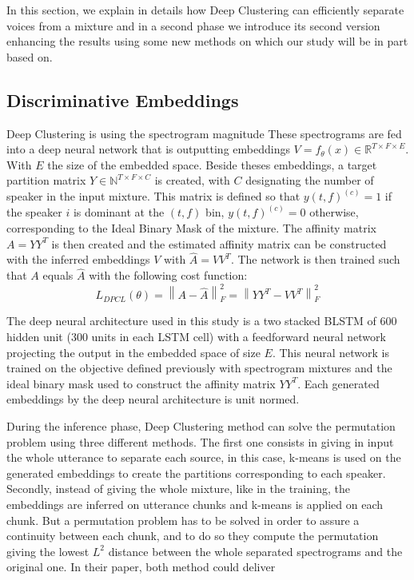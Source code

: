 \documentclass[master,final,11pt]{iscs-thesis}
\newcommand{\norm}[1]{\left\lVert#1\right\rVert}
\begin{document}
In this section, we explain in details how Deep Clustering can efficiently separate voices from a mixture and in a second phase we introduce its second version enhancing the results using some new methods on which our study will be in part based on.

\subsection{Discriminative Embeddings}
\label{DE}
Deep Clustering is using the spectrogram magnitude
These spectrograms are fed into a deep neural network that is outputting embeddings $V = f_\theta(x) \in \mathbb{R}^{T \times F \times E}$. With $E$ the size of the embedded space.
Beside theses embeddings, a target partition matrix $Y \in \mathbb{N}^{T \times F \times C}$ is created,  with $C$ designating the number of speaker in the input mixture. This matrix is defined so that $y(t,f)^{(c)} = 1$ if the speaker $i$ is dominant at the $(t,f)$ bin, $y(t,f)^{(c)} = 0$ otherwise, corresponding to the Ideal Binary Mask of the mixture. The affinity matrix $A = YY^{T}$ is then created and the estimated affinity matrix can be constructed with the inferred embeddings $V$ with $\hat{A}=VV^{T}$. The network is then trained such that $A$ equals $\hat{A}$ with the following cost function:
\[L_{DPCL}(\theta) = \norm{ A - \hat{A}}^2_F =  \norm{ YY^{T} - VV^{T}}^2_F \]
 
The deep neural architecture used in this study is a two stacked BLSTM of 600 hidden unit (300 units in each LSTM cell) with a feedforward neural network projecting the output in the embedded space of size $E$. This neural network is trained on the objective defined previously with spectrogram mixtures and the ideal binary mask used to construct the affinity matrix $YY^T$. Each generated embeddings by the deep neural architecture is unit normed.

During the inference phase, Deep Clustering method can solve the permutation problem using three different methods. The first one consists in giving in input the whole utterance to separate each source, in this case, k-means is used on the generated embeddings to create the partitions corresponding to each speaker. Secondly, instead of giving the whole mixture, like in the training, the embeddings are inferred on utterance chunks and k-means is applied on each chunk. But a permutation problem has to be solved in order to assure a continuity between each chunk, and to do so they compute the permutation giving the lowest $L^2$ distance between the whole separated spectrograms and the original one. In their paper, both method could deliver 
\end{document}
